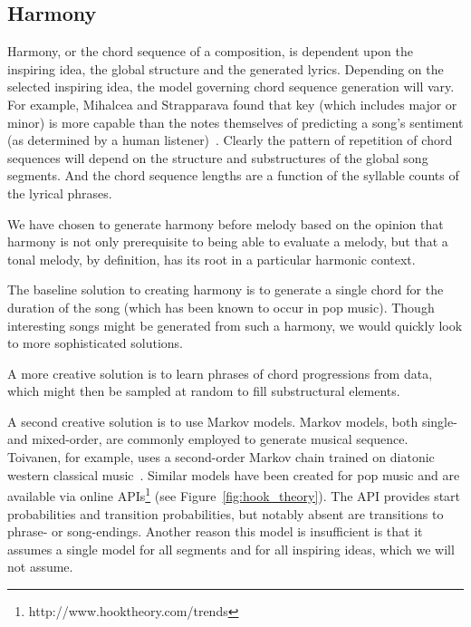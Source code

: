 \documentclass[11pt,phd]{byuprop}
\begin{document}
\subsection{Harmony}

Harmony, or the chord sequence of a composition, is dependent upon the inspiring idea, the global structure and the generated lyrics. Depending on the selected inspiring idea, the model governing chord sequence generation will vary. For example, Mihalcea and Strapparava found that key (which includes major or minor) is more capable than the notes themselves of predicting a song's sentiment (as determined by a human listener)~\cite{mihalcea2012lyrics}. Clearly the pattern of repetition of chord sequences will depend on the structure and substructures of the global song segments. And the chord sequence lengths are a function of the syllable counts of the lyrical phrases.

We have chosen to generate harmony before melody based on the opinion that harmony is not only prerequisite to being able to evaluate a melody, but that a tonal melody, by definition, has its root in a particular harmonic context.


The baseline solution to creating harmony is to generate a single chord for the duration of the song (which has been known to occur in pop music). Though interesting songs might be generated from such a harmony, we would quickly look to more sophisticated solutions.

A more creative solution is to learn phrases of chord progressions from data, which might then be sampled at random to fill substructural elements.

A second creative solution is to use Markov models. Markov models, both single- and mixed-order, are commonly employed to generate musical sequence. Toivanen, for example, uses a second-order Markov chain trained on diatonic western classical music~\cite{toivanen2013automatical}. Similar models have been created for pop music and are available via online APIs\footnote{http://www.hooktheory.com/trends} (see Figure~\ref{fig:hook_theory}). The API provides start probabilities and transition probabilities, but notably absent are transitions to phrase- or song-endings. Another reason this model is insufficient is that it assumes a single model for all segments and for all inspiring ideas, which we will not assume.
\end{document}
